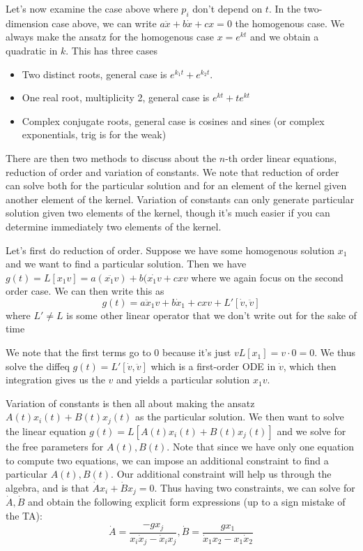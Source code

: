 \documentclass[10pt]{article}
\begin{document}
Let's now examine the case above where $p_i$ don't depend on $t$. In the two-dimension case above, we can write $a\ddot{x} + b\dot{x} + cx = 0$ the homogenous case. We always make the ansatz for the homogenous case $x=e^{kt}$ and we obtain a quadratic in $k$. This has three cases
\begin{itemize}
	\item Two distinct roots, general case is $e^{k_1t} + e^{k_2t}$.
	\item One real root, multiplicity 2, general case is $e^{kt}+ te^{kt}$
	\item Complex conjugate roots, general case is cosines and sines (or complex exponentials, trig is for the weak)
\end{itemize}

There are then two methods to discuss about the $n$-th order linear equations, reduction of order and variation of constants. We note that reduction of order can solve both for the particular solution and for an element of the kernel given another element of the kernel. Variation of constants can only generate particular solution given two elements of the kernel, though it's much easier if you can determine immediately two elements of the kernel.

Let's first do reduction of order. Suppose we have some homogenous solution $x_1$ and we want to find a particular solution. Then we have $g(t) = L[x_1v] = a(\ddot{x_1v}) + b(\dot{x_1v} + cxv$ where we again focus on the second order case. We can then write this as
$$g(t) = a\ddot{x}_1v + b\dot{x}_1 + cxv + L'\left[ \dot{v}, \ddot{v} \right]$$
where $L'\neq L$ is some other linear operator that we don't write out for the sake of time

We note that the first terms go to $0$ because it's just $vL[x_1] = v\cdot 0 = 0$. We thus solve the diffeq $g(t) = L'\left[ \dot{v},\ddot{v} \right]$ which is a first-order ODE in $\dot{v}$, which then integration gives us the $v$ and yields a particular solution $x_1v$. 

Variation of constants is then all about making the ansatz $A(t)x_i(t) + B(t)x_j(t)$ as the particular solution. We then want to solve the linear equation $g(t) = L\left[ A(t)x_i(t) + B(t)x_j(t) \right]$ and we solve for the free parameters for $A(t),B(t)$. Note that since we have only one equation to compute two equations, we can impose an additional constraint to find a particular $A(t),B(t)$. Our additional constraint will help us through the algebra, and is that $\dot{A}x_i + \dot{B}x_j = 0$. Thus having two constraints, we can solve for $\dot{A}, \dot{B}$ and obtain the following explicit form expressions (up to a sign mistake of the TA):
$$\dot{A} = \frac{-g x_j}{x_i\dot{x}_j - \dot{x}_i x_j}, \dot{B} = \frac{gx_1}{\dot{x}_1x_2 - x_1\dot{x}_2}$$
\end{document}
